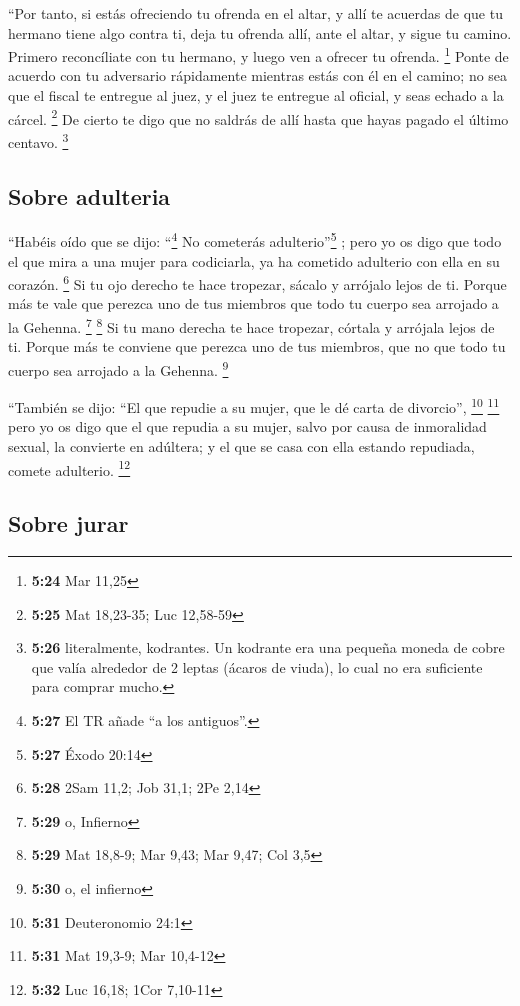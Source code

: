  ``Por tanto, si estás ofreciendo tu ofrenda en el altar,
y allí te acuerdas de que tu hermano tiene algo contra ti,
 deja tu ofrenda allí, ante el altar, y sigue tu camino.
Primero reconcíliate con tu hermano, y luego ven a ofrecer tu ofrenda.
\footnote{\textbf{5:24} Mar 11,25}  Ponte de acuerdo con
tu adversario rápidamente mientras estás con él en el camino; no sea que
el fiscal te entregue al juez, y el juez te entregue al oficial, y seas
echado a la cárcel. \footnote{\textbf{5:25} Mat 18,23-35; Luc 12,58-59}
 De cierto te digo que no saldrás de allí hasta que hayas
pagado el último centavo. \footnote{\textbf{5:26} literalmente,
  kodrantes. Un kodrante era una pequeña moneda de cobre que valía
  alrededor de 2 leptas (ácaros de viuda), lo cual no era suficiente
  para comprar mucho.}

\hypertarget{sobre-adulteria}{%
\subsection{Sobre adulteria}\label{sobre-adulteria}}

 ``Habéis oído que se dijo: ``\footnote{\textbf{5:27} El
  TR añade ``a los antiguos''.} No cometerás adulterio''\footnote{\textbf{5:27}
  Éxodo 20:14} ;  pero yo os digo que todo el que mira a
una mujer para codiciarla, ya ha cometido adulterio con ella en su
corazón. \footnote{\textbf{5:28} 2Sam 11,2; Job 31,1; 2Pe 2,14}
 Si tu ojo derecho te hace tropezar, sácalo y arrójalo
lejos de ti. Porque más te vale que perezca uno de tus miembros que todo
tu cuerpo sea arrojado a la Gehenna. \footnote{\textbf{5:29} o, Infierno}
\footnote{\textbf{5:29} Mat 18,8-9; Mar 9,43; Mar 9,47; Col 3,5}
 Si tu mano derecha te hace tropezar, córtala y arrójala
lejos de ti. Porque más te conviene que perezca uno de tus miembros, que
no que todo tu cuerpo sea arrojado a la Gehenna. \footnote{\textbf{5:30}
  o, el infierno}

 ``También se dijo: ``El que repudie a su mujer, que le
dé carta de divorcio'', \footnote{\textbf{5:31} Deuteronomio 24:1}
\footnote{\textbf{5:31} Mat 19,3-9; Mar 10,4-12}  pero yo
os digo que el que repudia a su mujer, salvo por causa de inmoralidad
sexual, la convierte en adúltera; y el que se casa con ella estando
repudiada, comete adulterio. \footnote{\textbf{5:32} Luc 16,18; 1Cor
  7,10-11}

\hypertarget{sobre-jurar}{%
\subsection{Sobre jurar}\label{sobre-jurar}}

